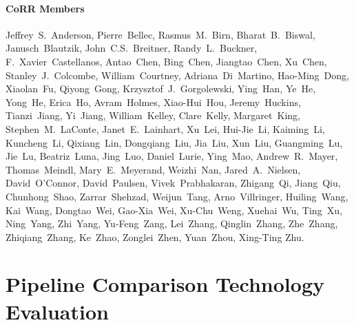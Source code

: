 \documentclass[11pt]{article}
\begin{document}

\paragraph{CoRR Members}
{\small
Jeffrey~S.~Anderson, Pierre~Bellec, Rasmus~M.~Birn, Bharat~B.~Biswal, Janusch~Blautzik, John~C.S.~Breitner, Randy~L.~Buckner, F.~Xavier~Castellanos, Antao~Chen, Bing~Chen, Jiangtao~Chen, Xu~Chen, Stanley~J.~Colcombe, William~Courtney, Adriana~Di~Martino, Hao-Ming~Dong, Xiaolan~Fu, Qiyong~Gong, Krzysztof~J.~Gorgolewski, Ying~Han, Ye~He, Yong~He, Erica~Ho, Avram~Holmes, Xiao-Hui~Hou, Jeremy~Huckins, Tianzi~Jiang, Yi~Jiang, William~Kelley, Clare~Kelly, Margaret~King, Stephen~M.~LaConte, Janet~E.~Lainhart, Xu~Lei, Hui-Jie~Li, Kaiming~Li, Kuncheng~Li, Qixiang~Lin, Dongqiang~Liu, Jia~Liu, Xun~Liu, Guangming~Lu, Jie~Lu, Beatriz~Luna, Jing~Luo, Daniel~Lurie, Ying~Mao, Andrew~R.~Mayer, Thomas~Meindl, Mary~E.~Meyerand, Weizhi~Nan, Jared~A.~Nielsen, David~O’Connor, David~Paulsen, Vivek~Prabhakaran, Zhigang~Qi, Jiang~Qiu, Chunhong~Shao, Zarrar~Shehzad, Weijun~Tang, Arno~Villringer, Huiling~Wang, Kai~Wang, Dongtao~Wei, Gao-Xia~Wei, Xu-Chu~Weng, Xuehai~Wu, Ting~Xu, Ning~Yang, Zhi~Yang, Yu-Feng~Zang, Lei~Zhang, Qinglin~Zhang, Zhe~Zhang, Zhiqiang~Zhang, Ke~Zhao, Zonglei~Zhen, Yuan~Zhou, Xing-Ting Zhu.
}

\vspace{-10pt}



\begin{spacing}{0.3}
{\footnotesize  }
\end{spacing}

\clearpage
\appendix

\renewcommand\thesection{Appendix~\Alph{section}}
\renewcommand{\thefigure}{S\arabic{figure}}
\setcounter{figure}{0}

%

\section{Pipeline Comparison Technology Evaluation}
\label{app:pipes}
\end{document}
